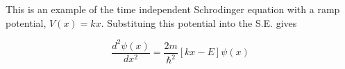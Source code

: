 \documentclass[a4paper,10pt]{article}
\begin{document}
This is an example of the time independent Schrodinger equation with a ramp potential, $V(x) = kx$.  Substituing this potential into the S.E. gives

$$\frac{d^2\psi(x)}{dx^2}=\frac{2m}{\hbar^2}\left[ kx - E \right] \psi(x)$$
\end{document}
